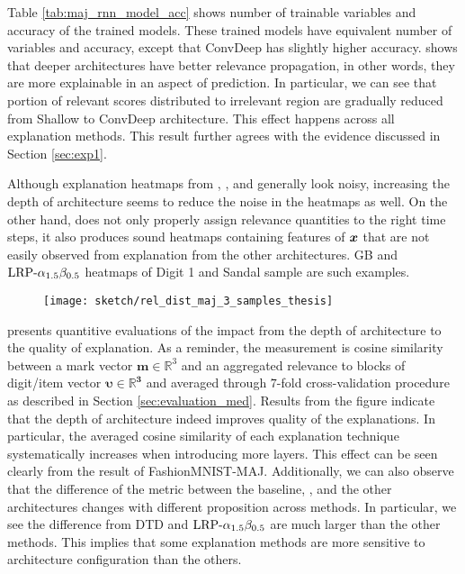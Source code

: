 Table \ref{tab:maj_rnn_model_acc} shows number of trainable variables and accuracy of the trained models. These trained models have equivalent number of variables and accuracy, except that ConvDeep has slightly higher accuracy. \addfigure{\ref{fig:heatmap_msc_mix_for_thesis}} shows that deeper architectures have better relevance propagation, in other words, they are more explainable in an aspect of prediction. In particular, we can see that portion of relevant scores distributed to irrelevant region are gradually reduced from Shallow to ConvDeep architecture. This effect happens across all explanation methods. This result further agrees with the evidence discussed in Section \ref{sec:exp1}.  

Although explanation heatmaps from , , and  generally look noisy, increasing the depth of architecture seems to reduce the noise in the heatmaps as well.   On the other hand,  does not  only properly assign relevance quantities to the right time steps, it also produces sound heatmaps containing features of $\boldsymbol{x}$ that are not easily observed from explanation from the other architectures.  GB and $\text{LRP-}\alpha_{1.5}\beta_{0.5}$ heatmaps of Digit 1 and Sandal sample are such examples.

\clearpage

 \begin{figure}[!hbt]
\centering
\texttt{[image: sketch/rel\_dist\_maj\_3\_samples\_thesis]}



\label{fig:rel_dist_maj_3_samples_thesis}
\end{figure}

\addfigure{\ref{fig:rel_dist_maj_3_samples_thesis}} presents quantitive  evaluations of the impact from the depth of architecture to the quality of explanation. As a reminder, the measurement is cosine similarity between a mark vector $\boldsymbol{m} \in \mathbb{R}^3$ and an aggregated relevance to blocks of digit/item vector $\boldsymbol{\upsilon \in \mathbb{R}^3 }$ and averaged through $7$-fold cross-validation procedure as described in Section \ref{sec:evaluation_med}. Results from the figure indicate that the depth of architecture indeed improves quality of the explanations. In particular, the averaged cosine similarity of each explanation technique systematically increases when introducing  more layers. This effect can be seen clearly from the result of FashionMNIST-MAJ. Additionally, we can also observe that the difference of the metric between the baseline, , and the other  architectures changes with different proposition across methods. In particular, we see the difference from DTD and $\text{LRP-}\alpha_{1.5}\beta_{0.5}$ are much larger than the other methods. This implies that some explanation methods are more sensitive to architecture configuration than the others.


